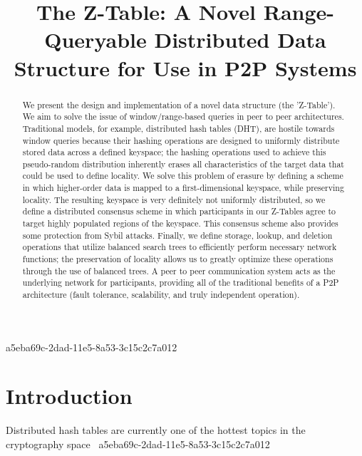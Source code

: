 \documentclass[12pt]{article}
\title{The Z-Table: A Novel Range-Queryable Distributed Data Structure for Use in P2P Systems}
\begin{document}
\maketitle

\begin{abstract}
We present the design and implementation of a novel data structure (the 'Z-Table'). We aim to solve the issue of window/range-based queries in peer to peer architectures. Traditional models, for example,  distributed hash tables (DHT), are hostile towards window queries because their hashing operations are designed to uniformly distribute stored data across a defined keyspace; the hashing operations used to achieve this pseudo-random distribution inherently erases all characteristics of the target data that could be used to define locality. We solve this problem of erasure by defining a scheme in which higher-order data is mapped to a first-dimensional keyspace, while preserving locality. The resulting keyspace is very definitely not uniformly distributed, so we define a distributed consensus scheme in which participants in our Z-Tables agree to target highly populated regions of the keyspace. This consensus scheme also provides some protection from Sybil attacks. Finally, we define storage, lookup, and deletion operations that utilize balanced search trees to efficiently perform necessary network functions; the preservation of locality allows us to greatly optimize these operations through the use of balanced trees. A peer to peer communication system acts as the underlying network for participants, providing all of the traditional benefits of a P2P architecture (fault tolerance, scalability, and truly independent operation).
\end{abstract}


a5eba69c-2dad-11e5-8a53-3c15c2c7a012\newpage
\section{Introduction}
Distributed hash tables are currently one of the hottest topics in the cryptography space~\cite{Stoica:2001dj,Rowstron:2001ea,Ratnasamy:2001wn}
a5eba69c-2dad-11e5-8a53-3c15c2c7a012
\printbibliography
\end{document}
